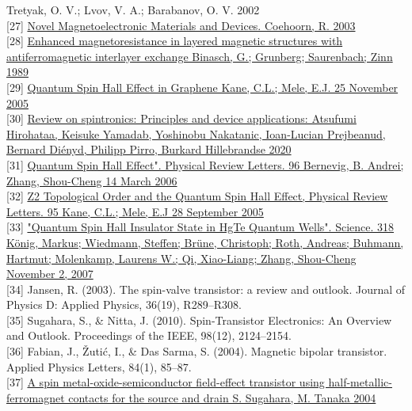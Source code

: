 \documentclass{article}
\begin{document}
Tretyak, O. V.; Lvov, V. A.; Barabanov, O. V.
2002\\[0pt]
[27] \href{https://web.archive.org/web/20110724184833/http://web.phys.tue.nl/fileadmin/tn/de_faculteit/capaciteitsgroepen/FM/FNA/Students_Education/Lectures_Courses/Coehoorn_Lecture-Notes-SVs-Part1-final.pdf}{Novel Magnetoelectronic Materials and Devices.
Coehoorn, R.
2003}\\[0pt]
[28] \href{https://journals.aps.org/prb/pdf/10.1103/PhysRevB.39.4828}{Enhanced magnetoresistance in layered magnetic structures with antiferromagnetic interlayer exchange
Binasch, G.; Grunberg; Saurenbach; Zinn
1989}\\[0pt]
[29] \href{https://arxiv.org/abs/cond-mat/0411737}{Quantum Spin Hall Effect in Graphene
Kane, C.L.; Mele, E.J.
25 November 2005}\\[0pt]
[30] \href{http://eprints.whiterose.ac.uk/158329/1/1_s2.0_S0304885320302353_main.pdf}{Review on spintronics: Principles and device applications: Atsufumi Hirohataa, Keisuke Yamadab, Yoshinobu Nakatanic, Ioan-Lucian Prejbeanud, Bernard Diényd, Philipp Pirro, Burkard Hillebrandse
2020}\\[0pt]
[31] \href{https://journals.aps.org/prl/abstract/10.1103/PhysRevLett.96.106802}{Quantum Spin Hall Effect". Physical Review Letters. 96
Bernevig, B. Andrei; Zhang, Shou-Cheng
14 March 2006}\\[0pt]
[32] \href{https://journals.aps.org/prl/abstract/10.1103/PhysRevLett.95.146802}{Z2 Topological Order and the Quantum Spin Hall Effect, Physical Review Letters. 95
Kane, C.L.; Mele, E.J
28 September 2005}\\[0pt]
[33] \href{https://science.sciencemag.org/content/318/5851/766}{"Quantum Spin Hall Insulator State in HgTe Quantum Wells". Science. 318
König, Markus; Wiedmann, Steffen; Brüne, Christoph; Roth, Andreas; Buhmann, Hartmut; Molenkamp, Laurens W.; Qi, Xiao-Liang; Zhang, Shou-Cheng
November 2, 2007}\\[0pt]
[34] Jansen, R. (2003). The spin-valve transistor: a review and outlook. Journal of Physics D: Applied Physics, 36(19), R289–R308.\\[0pt]
[35] Sugahara, S., \& Nitta, J. (2010). Spin-Transistor Electronics: An Overview and Outlook. Proceedings of the IEEE, 98(12), 2124–2154. \\[0pt]
[36] Fabian, J., Žutić, I., \& Das Sarma, S. (2004). Magnetic bipolar transistor. Applied Physics Letters, 84(1), 85–87.\\[0pt]
[37] \href{https://aip.scitation.org/doi/10.1063/1.1689403}{A spin metal-oxide-semiconductor field-effect transistor using
half-metallic-ferromagnet contacts for the source and drain
S. Sugahara, M. Tanaka
2004}
\end{document}
